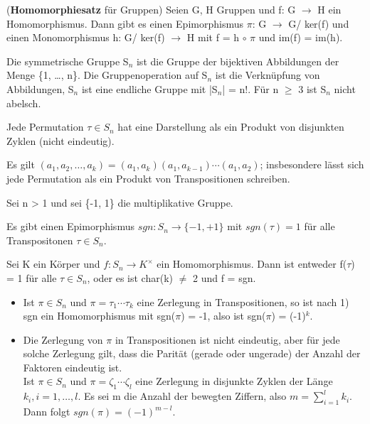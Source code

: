 \begin{theorem}
(\textbf{Homomorphiesatz} für Gruppen)
Seien G, H Gruppen und f: G $\to$ H ein Homomorphismus. Dann gibt es einen Epimorphismus $\pi$: G $\to$ G/ ker(f) und einen Monomorphismus h: G/ ker(f) $\to$ H mit f = h $\circ$ $\pi$ und im(f) = im(h).
\end{theorem}

\begin{remark}
Die symmetrische Gruppe S$_n$ ist die Gruppe der bijektiven Abbildungen der Menge \{1, …, n\}. Die Gruppenoperation auf S$_n$ ist die Verknüpfung von Abbildungen, S$_n$ ist eine endliche Gruppe mit |S$_n$| = n!. Für n $\ge$ 3 ist S$_n$ nicht abelsch.
\end{remark}

\begin{lemma}
\leavevmode
\begin{compactenum}
\item Jede Permutation $\tau \in S_n$ hat eine Darstellung als ein Produkt von disjunkten Zyklen (nicht eindeutig).
\item Es gilt $(a_1, a_2, …, a_k) = (a_1, a_k)(a_1, a_{k-1}) \cdots (a_1, a_2)$; insbesondere lässt sich jede Permutation als ein Produkt von Transpositionen schreiben.
\end{compactenum}
\end{lemma}

\begin{theorem}
Sei n > 1 und sei \{-1, 1\} die multiplikative Gruppe.
\begin{compactenum}
\item Es gibt einen Epimorphismus $sgn: S_n \to \{-1,+1\}$ mit $sgn(\tau) = 1$ für alle Transpositonen $\tau \in S_n$.
\item Sei K ein Körper und $f: S_n \to K^\times$ ein Homomorphismus. Dann ist entweder f($\tau$) = 1 für alle $\tau \in S_n$, oder es ist char(k) $\neq$ 2 und f = sgn.
\end{compactenum}
\end{theorem}

\begin{remark}
\leavevmode
\begin{itemize}
\item Ist $\pi \in S_n$ und $\pi = \tau_1 \cdots \tau_k$ eine Zerlegung in Transpositionen, so ist nach 1) sgn ein Homomorphismus mit sgn($\pi$) = -1, also ist sgn($\pi$) = (-1)$^k$.

\item Die Zerlegung von $\pi$ in Transpositionen ist nicht eindeutig, aber für jede solche Zerlegung gilt, dass die Parität (gerade oder ungerade) der Anzahl der Faktoren eindeutig ist.\\
Ist $\pi \in S_n$ und $\pi = \zeta_1 \cdots \zeta_l$ eine Zerlegung in disjunkte Zyklen der Länge $k_i, i = 1, …, l$. Es sei m die Anzahl der bewegten Ziffern, also $m = \sum\nolimits_{i=1}^{l} k_i$. Dann folgt $sgn(\pi) = (-1)^{m-l}$.
\end{itemize}
\end{remark}

